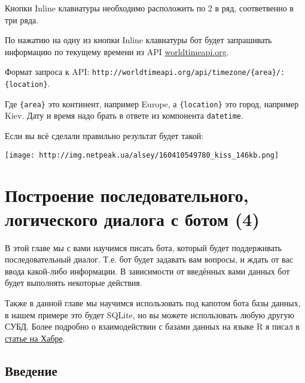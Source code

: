 \documentclass[
]{book}
\begin{document}
Кнопки Inline клавиатуры необходимо расположить по 2 в ряд, соответвенно в три ряда.

По нажатию на одну из кнопки Inline клавиатуры бот будет запрашивать информацию по текущему времени из API \href{http://worldtimeapi.org/}{worldtimeapi.org}.

Формат запроса к API: \texttt{http://worldtimeapi.org/api/timezone/\{area\}/:\{location\}}.

Где \texttt{\{area\}} это континент, например Europe, а \texttt{\{location\}} это город, например Kiev. Дату и время надо брать в ответе из компонента \texttt{datetime}.

Если вы всё сделали правильно результат будет такой:

\texttt{[image: http://img.netpeak.ua/alsey/160410549780\_kiss\_146kb.png]}

\hypertarget{ux43fux43eux441ux442ux440ux43eux435ux43dux438ux435-ux43fux43eux441ux43bux435ux434ux43eux432ux430ux442ux435ux43bux44cux43dux43eux433ux43e-ux43bux43eux433ux438ux447ux435ux441ux43aux43eux433ux43e-ux434ux438ux430ux43bux43eux433ux430-ux441-ux431ux43eux442ux43eux43c-4}{%
\chapter{Построение последовательного, логического диалога с ботом (4)}\label{ux43fux43eux441ux442ux440ux43eux435ux43dux438ux435-ux43fux43eux441ux43bux435ux434ux43eux432ux430ux442ux435ux43bux44cux43dux43eux433ux43e-ux43bux43eux433ux438ux447ux435ux441ux43aux43eux433ux43e-ux434ux438ux430ux43bux43eux433ux430-ux441-ux431ux43eux442ux43eux43c-4}}

В этой главе мы с вами научимся писать бота, который будет поддерживать последовательный диалог. Т.е. бот будет задавать вам вопросы, и ждать от вас ввода какой-либо информации. В зависимости от введённых вами данных бот будет выполнять некоторые действия.

Также в данной главе мы научимся использовать под капотом бота базы данных, в нашем примере это будет SQLite, но вы можете использовать любую другую СУБД. Более подробно о взаимодействии с базами данных на языке R я писал в \href{https://habr.com/ru/post/469215/}{статье на Хабре}.

\hypertarget{ux432ux432ux435ux434ux435ux43dux438ux435-1}{%
\section{Введение}\label{ux432ux432ux435ux434ux435ux43dux438ux435-1}}
\end{document}
